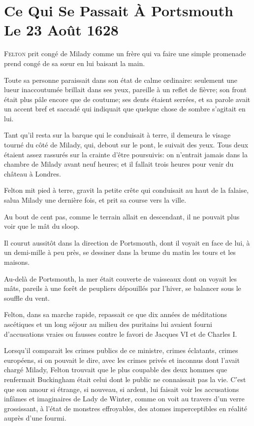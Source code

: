 
\chapter[Portsmouth, le 23 Août 1628]{Ce Qui Se Passait À Portsmouth Le 23 Août 1628}

\lettrine{F}{elton} prit congé de Milady comme un frère qui va faire une simple promenade prend congé de sa sœur en lui baisant la main. 

\zz
Toute sa personne paraissait dans son état de calme ordinaire: seulement une lueur inaccoutumée brillait dans ses yeux, pareille à un reflet de fièvre; son front était plus pâle encore que de coutume; ses dents étaient serrées, et sa parole avait un accent bref et saccadé qui indiquait que quelque chose de sombre s'agitait en lui. 

Tant qu'il resta sur la barque qui le conduisait à terre, il demeura le visage tourné du côté de Milady, qui, debout sur le pont, le suivait des yeux. Tous deux étaient assez rassurés sur la crainte d'être poursuivis: on n'entrait jamais dans la chambre de Milady avant neuf heures; et il fallait trois heures pour venir du château à Londres. 

Felton mit pied à terre, gravit la petite crête qui conduisait au haut de la falaise, salua Milady une dernière fois, et prit sa course vers la ville. 

Au bout de cent pas, comme le terrain allait en descendant, il ne pouvait plus voir que le mât du sloop. 

Il courut aussitôt dans la direction de Portsmouth, dont il voyait en face de lui, à un demi-mille à peu près, se dessiner dans la brume du matin les tours et les maisons. 

Au-delà de Portsmouth, la mer était couverte de vaisseaux dont on voyait les mâts, pareils à une forêt de peupliers dépouillés par l'hiver, se balancer sous le souffle du vent. 

Felton, dans sa marche rapide, repassait ce que dix années de méditations ascétiques et un long séjour au milieu des puritains lui avaient fourni d'accusations vraies ou fausses contre le favori de Jacques VI et de Charles I\ier. 

Lorsqu'il comparait les crimes publics de ce ministre, crimes éclatants, crimes européens, si on pouvait le dire, avec les crimes privés et inconnus dont l'avait chargé Milady, Felton trouvait que le plus coupable des deux hommes que renfermait Buckingham était celui dont le public ne connaissait pas la vie. C'est que son amour si étrange, si nouveau, si ardent, lui faisait voir les accusations infâmes et imaginaires de Lady de Winter, comme on voit au travers d'un verre grossissant, à l'état de monstres effroyables, des atomes imperceptibles en réalité auprès d'une fourmi. 

